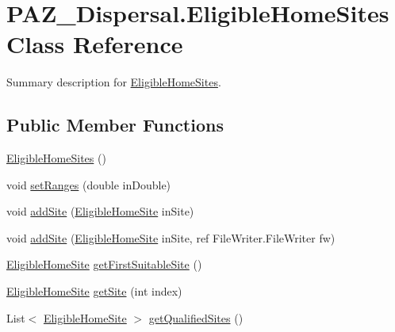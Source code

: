 \hypertarget{class_p_a_z___dispersal_1_1_eligible_home_sites}{\section{P\-A\-Z\-\_\-\-Dispersal.\-Eligible\-Home\-Sites Class Reference}
\label{class_p_a_z___dispersal_1_1_eligible_home_sites}
}


Summary description for \hyperlink{class_p_a_z___dispersal_1_1_eligible_home_sites}{Eligible\-Home\-Sites}.  


\subsection*{Public Member Functions}
\begin{DoxyCompactItemize}
\item 
\hyperlink{class_p_a_z___dispersal_1_1_eligible_home_sites_ab7a3ba63b5cda52e70ae4adf6e02f45b}{Eligible\-Home\-Sites} ()
\item 
void \hyperlink{class_p_a_z___dispersal_1_1_eligible_home_sites_a977a0eb0631bd03e21d76454b5f1c754}{set\-Ranges} (double in\-Double)
\item 
void \hyperlink{class_p_a_z___dispersal_1_1_eligible_home_sites_aaa02c05ee61c231207fd6bcc6b54ae41}{add\-Site} (\hyperlink{class_p_a_z___dispersal_1_1_eligible_home_site}{Eligible\-Home\-Site} in\-Site)
\item 
void \hyperlink{class_p_a_z___dispersal_1_1_eligible_home_sites_a7c73cca65eb13a63819b1fc9e32649b4}{add\-Site} (\hyperlink{class_p_a_z___dispersal_1_1_eligible_home_site}{Eligible\-Home\-Site} in\-Site, ref File\-Writer.\-File\-Writer fw)
\item 
\hyperlink{class_p_a_z___dispersal_1_1_eligible_home_site}{Eligible\-Home\-Site} \hyperlink{class_p_a_z___dispersal_1_1_eligible_home_sites_a812196b87c2eff0fcc412d65df246cba}{get\-First\-Suitable\-Site} ()
\item 
\hyperlink{class_p_a_z___dispersal_1_1_eligible_home_site}{Eligible\-Home\-Site} \hyperlink{class_p_a_z___dispersal_1_1_eligible_home_sites_a0f0ac3861a8e2becab90d244014feb08}{get\-Site} (int index)
\item 
List$<$ \hyperlink{class_p_a_z___dispersal_1_1_eligible_home_site}{Eligible\-Home\-Site} $>$ \hyperlink{class_p_a_z___dispersal_1_1_eligible_home_sites_a8bfe4cf93301727c2463c44e9e8f5a90}{get\-Qualified\-Sites} ()
\item 

\end{DoxyCompactItemize}
